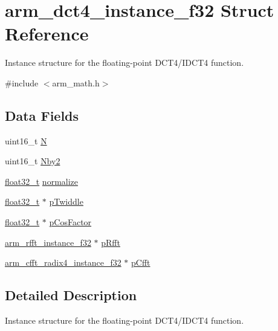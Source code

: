 \hypertarget{structarm__dct4__instance__f32}{}\section{arm\+\_\+dct4\+\_\+instance\+\_\+f32 Struct Reference}
\label{structarm__dct4__instance__f32}


Instance structure for the floating-\/point D\+C\+T4/\+I\+D\+C\+T4 function.  




{\ttfamily \#include $<$arm\+\_\+math.\+h$>$}

\subsection*{Data Fields}
\begin{DoxyCompactItemize}
\item 
uint16\+\_\+t \mbox{\hyperlink{structarm__dct4__instance__f32_a37d49571fe35012087153c093705cd11}{N}}
\item 
uint16\+\_\+t \mbox{\hyperlink{structarm__dct4__instance__f32_afa64b1618089e35c2b55cff71cb29715}{Nby2}}
\item 
\mbox{\hyperlink{arm__math_8h_a4611b605e45ab401f02cab15c5e38715}{float32\+\_\+t}} \mbox{\hyperlink{structarm__dct4__instance__f32_a1bf2ed86ef2c3dd83af606bb3f520f2a}{normalize}}
\item 
\mbox{\hyperlink{arm__math_8h_a4611b605e45ab401f02cab15c5e38715}{float32\+\_\+t}} $\ast$ \mbox{\hyperlink{structarm__dct4__instance__f32_aca581481fccdff0f557f54a3ef20d967}{p\+Twiddle}}
\item 
\mbox{\hyperlink{arm__math_8h_a4611b605e45ab401f02cab15c5e38715}{float32\+\_\+t}} $\ast$ \mbox{\hyperlink{structarm__dct4__instance__f32_abd73b9d7fb4951ba086e4820c2a48eb0}{p\+Cos\+Factor}}
\item 
\mbox{\hyperlink{structarm__rfft__instance__f32}{arm\+\_\+rfft\+\_\+instance\+\_\+f32}} $\ast$ \mbox{\hyperlink{structarm__dct4__instance__f32_ad4cd7c85eea3f7c5fff4630bbd979e6a}{p\+Rfft}}
\item 
\mbox{\hyperlink{structarm__cfft__radix4__instance__f32}{arm\+\_\+cfft\+\_\+radix4\+\_\+instance\+\_\+f32}} $\ast$ \mbox{\hyperlink{structarm__dct4__instance__f32_ab7bd4d374a1780dea50efd3e7ac220be}{p\+Cfft}}
\end{DoxyCompactItemize}


\subsection{Detailed Description}
Instance structure for the floating-\/point D\+C\+T4/\+I\+D\+C\+T4 function. 

